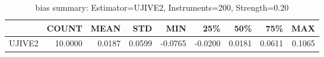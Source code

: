 \begin{table}[ht]
\centering
\caption{bias summary: Estimator=UJIVE2, Instruments=200, Strength=0.20}
\begin{tabular}{lrrrrrrrr}
\toprule
 & COUNT & MEAN & STD & MIN & 25\% & 50\% & 75\% & MAX \\
\midrule
UJIVE2 & 10.0000 & 0.0187 & 0.0599 & -0.0765 & -0.0200 & 0.0181 & 0.0611 & 0.1065 \\
\bottomrule
\end{tabular}
\end{table}

